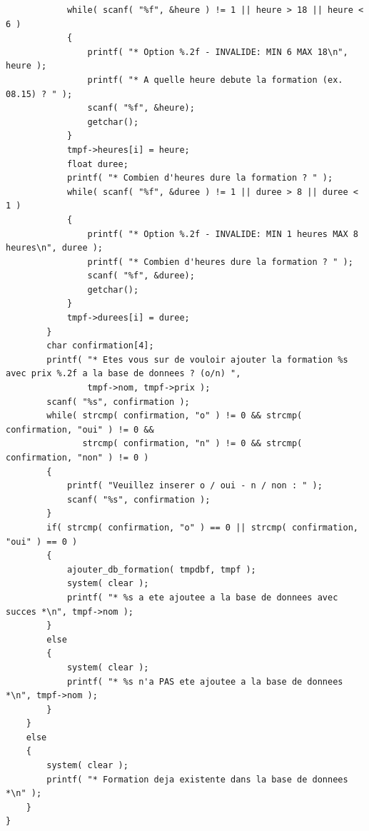 \documentclass[11pt]{article}
\begin{document}
\begin{lstlisting}
            while( scanf( "%f", &heure ) != 1 || heure > 18 || heure < 6 )
            {
                printf( "* Option %.2f - INVALIDE: MIN 6 MAX 18\n", heure );
                printf( "* A quelle heure debute la formation (ex. 08.15) ? " );
                scanf( "%f", &heure);
                getchar();
            }
            tmpf->heures[i] = heure;
            float duree;
            printf( "* Combien d'heures dure la formation ? " );
            while( scanf( "%f", &duree ) != 1 || duree > 8 || duree < 1 )
            {
                printf( "* Option %.2f - INVALIDE: MIN 1 heures MAX 8 heures\n", duree );
                printf( "* Combien d'heures dure la formation ? " );
                scanf( "%f", &duree);
                getchar();
            }
            tmpf->durees[i] = duree;
        }
        char confirmation[4];
        printf( "* Etes vous sur de vouloir ajouter la formation %s avec prix %.2f a la base de donnees ? (o/n) ",
                tmpf->nom, tmpf->prix );
        scanf( "%s", confirmation );
        while( strcmp( confirmation, "o" ) != 0 && strcmp( confirmation, "oui" ) != 0 &&
               strcmp( confirmation, "n" ) != 0 && strcmp( confirmation, "non" ) != 0 )
        {
            printf( "Veuillez inserer o / oui - n / non : " );
            scanf( "%s", confirmation );
        }
        if( strcmp( confirmation, "o" ) == 0 || strcmp( confirmation, "oui" ) == 0 )
        {
            ajouter_db_formation( tmpdbf, tmpf );
            system( clear );
            printf( "* %s a ete ajoutee a la base de donnees avec succes *\n", tmpf->nom );
        }
        else
        {
            system( clear );
            printf( "* %s n'a PAS ete ajoutee a la base de donnees *\n", tmpf->nom );
        }
    }
    else
    {
        system( clear );
        printf( "* Formation deja existente dans la base de donnees *\n" );
    }
}


\end{lstlisting}
\end{document}
